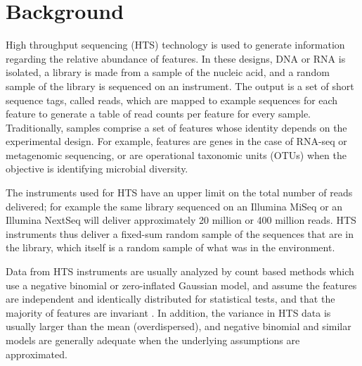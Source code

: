 \documentclass{bmcart}
\begin{document}


\section*{Background}
High throughput sequencing (HTS) technology is used to generate information regarding the relative abundance of features.  In these designs, DNA or RNA is isolated, a library is made from a  sample of the nucleic acid, and a random sample of the library is sequenced on an instrument. The output is a set of short sequence tags, called reads, which are mapped to example sequences for each feature to generate a table of read counts per feature for every sample. Traditionally, samples comprise a set of features whose identity depends on the experimental design. For example, features are genes in the case of RNA-seq or  metagenomic sequencing, or are operational taxonomic units (OTUs) when the objective is identifying microbial diversity. 
 
The instruments used for HTS have an upper limit on the total number of reads delivered; for example the same library sequenced on an Illumina MiSeq or an Illumina NextSeq will deliver approximately 20 million or 400 million reads. HTS instruments thus deliver a fixed-sum random sample of the sequences that are in the library, which itself is a random sample of what was in the environment. 

Data from HTS instruments are usually analyzed by count based methods which use a negative binomial or zero-inflated Gaussian model, and assume the features are independent and identically distributed for statistical tests, and that the majority of features are invariant \cite{Auer:2010aa,Anders:2013aa}. In addition, the variance in HTS data is usually larger than the mean (overdispersed), and negative binomial and similar models are generally adequate when the underlying assumptions are approximated.
\end{document}
